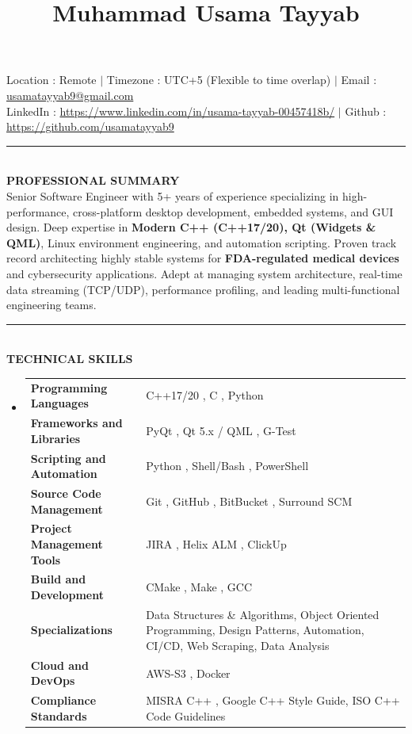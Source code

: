 \documentclass[10pt,a4paper]{article}
\title{
	\textbf{Muhammad Usama Tayyab}
}
\date{}
\author{}
\newcommand{\MyHorizontalLine}{\noindent\rule{\linewidth}{1.5pt}\\}
\begin{document}
	\maketitle
	\vspace{-30pt}
	\begin{center}
		Location : Remote $|$ Timezone : UTC+5 (Flexible to time overlap) $|$ Email : \href{mailto:usamatayyab9@gmail.com}{usamatayyab9@gmail.com}\\
		LinkedIn : \href{https://www.linkedin.com/in/usama-tayyab-00457418b/}{https://www.linkedin.com/in/usama-tayyab-00457418b/} $|$ Github : \href{https://github.com/usamatayyab9}{https://github.com/usamatayyab9}
	\end{center}
\MyHorizontalLine
	\textbf{PROFESSIONAL SUMMARY}
		\newline\\
		Senior Software Engineer with 5+ years of experience specializing in high-performance, cross-platform desktop development, embedded systems, and GUI design. Deep expertise in \textbf{Modern C++ (C++17/20), Qt (Widgets \& QML)}, Linux environment engineering, and automation scripting. Proven track record architecting highly stable systems for \textbf{FDA-regulated medical devices} and cybersecurity applications. Adept at managing system architecture, real-time data streaming (TCP/UDP), performance profiling, and leading multi-functional engineering teams.
		\\
		
\MyHorizontalLine
	\textbf{TECHNICAL SKILLS}
	\begin{itemize}
		\item[]
		\begin{tabularx}{1.0\linewidth}{l @{\quad:\quad} X}
	\textbf{Programming Languages	} & C++17/20	, C			 	, Python 		\\[4pt]
	\textbf{Frameworks and Libraries} & PyQt		, Qt 5.x / QML	, G-Test 	 	\\[4pt]
	\textbf{Scripting and Automation} & Python		, Shell/Bash	, PowerShell 	\\[4pt]
	\textbf{Source Code Management	} & Git			, GitHub		, BitBucket		, Surround SCM \\[4pt]
	\textbf{Project Management Tools} & JIRA		, Helix ALM		, ClickUp 		\\[4pt]
	\textbf{Build and Development	} & CMake		, Make			, GCC 			\\[4pt]
	\textbf{Specializations			} & Data Structures \& Algorithms, Object Oriented Programming, Design Patterns, Automation, CI/CD, Web Scraping, Data Analysis \\[4pt]
	\textbf{Cloud and DevOps		} & AWS-S3		, Docker\\[4pt]
	\textbf{Compliance Standards	} & MISRA C++		, Google C++ Style Guide, ISO C++ Code Guidelines
		\end{tabularx}
	\end{itemize}
	
\end{document}
